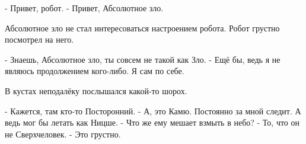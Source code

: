 - Привет, робот.
- Привет, Абсолютное зло.

Абсолютное зло не стал интересоваться настроением робота. Робот грустно посмотрел на него.

- Знаешь, Абсолютное зло, ты совсем не такой как Зло.
- Ещё бы, ведь я не являюсь продолжением кого-либо. Я сам по себе.

В кустах неподалёку послышался какой-то шорох.

- Кажется, там кто-то Посторонний.
- А, это Камю. Постоянно за мной следит. А ведь мог бы летать как Ницше.
- Что же ему мешает взмыть в небо?
- То, что он не Сверхчеловек.
- Это грустно.